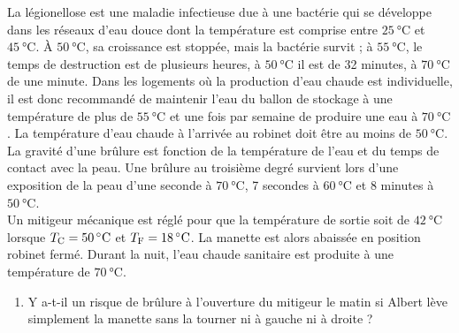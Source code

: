 \documentclass[a4paper,french,bookmarks]{article}
\begin{document}
La légionellose est une maladie infectieuse due à une bactérie qui se développe dans les réseaux d'eau douce dont la température est comprise entre $\SI{25}{\celsius}$ et $\SI{45}{\celsius}$. À $\SI{50}{\celsius}$, sa croissance est stoppée, mais la bactérie survit ; à $\SI{55}{\celsius}$, le temps de destruction est de plusieurs heures, à $\SI{50}{\celsius}$ il est de 32 minutes, à $\SI{70}{\celsius}$ de une minute. Dans les logements où la production d'eau chaude est individuelle, il est donc recommandé de maintenir l'eau du ballon de stockage à une température de plus de $\SI{55}{\celsius}$ et une fois par semaine de produire une eau à $\SI{70}{\celsius}$. La température d'eau chaude à l'arrivée au robinet doit être au moins de $\SI{50}{\celsius}$.\\[2pt]
%
La gravité d'une brûlure est fonction de la température de l'eau et du temps de contact avec la peau. Une brûlure au troisième degré survient lors d'une exposition de la peau d'une seconde à $\SI{70}{\celsius}$, 7 secondes à $\SI{60}{\celsius}$ et 8 minutes à $\SI{50}{\celsius}$.\\[2pt]
%
Un mitigeur mécanique est réglé pour que la température de sortie soit de $\SI{42}{\celsius}$ lorsque $T_\text C = \SI{50}{\celsius}$ et $T_\text F =\SI{18}{\celsius}$. La manette est alors abaissée en position robinet fermé. Durant la nuit, l'eau chaude sanitaire est produite à une température de $\SI{70}{\celsius}$.

\begin{enumerate}[resume]
    \item Y a-t-il un risque de brûlure à l'ouverture du mitigeur le matin si Albert lève simplement la manette sans la tourner ni à gauche ni à droite ?
    
\end{enumerate}
\end{document}
